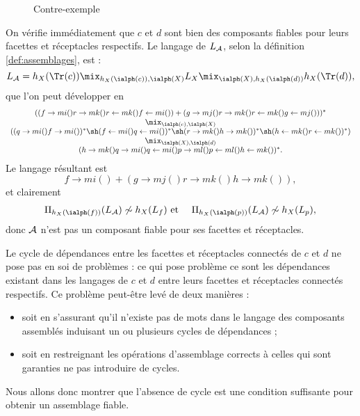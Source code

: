 \begin{figure}[htbp]
    \centering
    \caption{Contre-exemple}
    \label{fig-compo-contrex}
\end{figure}

On v\'erifie imm\'ediatement que $c$ et $d$ sont bien des composants
fiables pour leurs facettes et r\'eceptacles respectifs.
Le langage de $L_{\cal A}$,
selon la d\'efinition \ref{def:assemblages}, est :
$$
L_{\cal A} = h_X(\Tr(c)) \mix_{h_X(\ialph(c)),\ialph(X)} L_X
\mix_{\ialph(X),h_X(\ialph(d))} h_X(\Tr(d)),
$$
que l'on peut d\'evelopper en 
$$
\begin{array}{c}
((f\rightarrow mi() r\rightarrow mk() r\leftarrow mk() f\leftarrow
mi()) + (g\rightarrow mj() r\rightarrow mk() r\leftarrow mk() g\leftarrow
mj()))^*  \\
    \mix_{\ialph(c),\ialph(X)}   \\
((q\rightarrow mi() f\rightarrow mi())^* \sh (f\leftarrow mi() q\leftarrow
    mi())^* \sh  (r\rightarrow mk() h\rightarrow mk())^* \sh (h\leftarrow mk() r\leftarrow mk())^*) \\
\mix_{\ialph(X),\ialph(d)}   \\
(h\rightarrow mk() q\rightarrow mi() q\leftarrow mi() p\rightarrow
ml() p\leftarrow ml() h\leftarrow mk())^*.     
\end{array}
$$
Le langage r\'esultant est 
$$
f\rightarrow mi() + (g\rightarrow mj() r\rightarrow mk() h\rightarrow mk()),
$$
 et clairement
\begin{align*}
    \Pi_{h_X(\ialph(f))}(L_{\cal A}) \not\sim h_X(L_f) &\mbox{~et~} &\Pi_{h_X(\ialph(p))}(L_{\cal A}) \not\sim h_X(L_p),
\end{align*}
donc ${\cal A}$ n'est pas un composant fiable pour ses facettes et
r\'eceptacles.

Le cycle de d\'ependances entre les facettes et r\'eceptacles
connect\'es de $c$ et $d$ ne pose pas en soi de probl\`emes :  ce
qui pose probl\`eme ce sont les d\'ependances existant dans les
langages de $c$ et $d$ entre leurs facettes et  r\'eceptacles
connect\'es respectifs. Ce probl\`eme peut-\^etre lev\'e de deux
mani\`eres :
\begin{itemize}
  \item soit en s'assurant qu'il n'existe pas de mots dans le langage
  des composants assembl\'es induisant un ou plusieurs cycles de
  d\'ependances ;
\item soit en restreignant les op\'erations d'assemblage corrects
  \`a celles qui sont garanties ne pas introduire de cycles. 
\end{itemize}
Nous allons donc montrer que l'absence de cycle
est une condition suffisante pour obtenir un assemblage fiable. 


